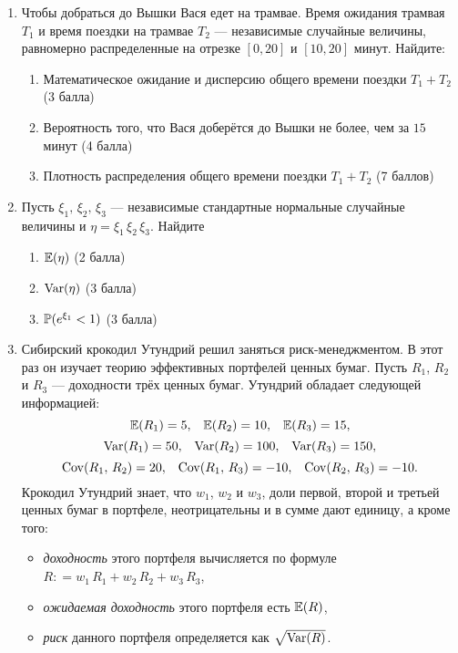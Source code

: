 \begin{enumerate}
    \item Чтобы добраться до Вышки Вася едет на трамвае. Время ожидания трамвая
    $T_{1}$ и время поездки на трамвае $T_{2}$ — независимые случайные величины,
    равномерно распределенные на отрезке $[0,20]$ и $[10,20]$ минут. Найдите:

    \begin{enumerate}
    \item Математическое ожидание и дисперсию общего времени поездки $T_{1}+T_{2}$ (3 балла)
    \item Вероятность того, что Вася доберётся до Вышки не более, чем за $15$ минут (4 балла)
    \item Плотность распределения общего времени поездки $T_{1}+T_{2}$ (7 баллов)
\end{enumerate}

    \item Пусть $\xi_1, \, \xi_2, \, \xi_3$ — независимые стандартные нормальные
    случайные величины и $\eta = \xi_1 \, \xi_2 \, \xi_3$. Найдите
\begin{enumerate}
  \item $\E(\eta)$ (2 балла)
  \item $\Var(\eta)$ (3 балла)
  \item $\P(e^{\xi_1} < 1)$ (3 балла)
\end{enumerate}

    \item Сибирский крокодил Утундрий решил заняться риск-менеджментом. В этот раз
    он изучает теорию эффективных портфелей ценных бумаг. Пусть $R_1$, $R_2$ и $R_3$ —
    доходности трёх ценных бумаг. Утундрий обладает следующей информацией:
\[
    \E(R_1) = 5, \;\;\; \E(R_2) = 10, \;\;\; \E(R_3) = 15,
\]
\[
    \Var(R_1) = 50, \;\;\; \Var(R_2) = 100, \;\;\; \Var(R_3) = 150,
\]
\[
    \Cov(R_1, \, R_2) = 20, \;\;\; \Cov(R_1, \, R_3) = -10, \;\;\; \Cov(R_2, \, R_3) = -10.
\]
Крокодил Утундрий знает, что $w_1$, $w_2$ и $w_3$, доли первой, второй и третьей
ценных бумаг в портфеле, неотрицательны и в сумме дают единицу, а кроме того:
\begin{itemize}
  \item \textit{доходность} этого портфеля вычисляется по формуле
  $R : = w_1 \, R_1 + w_2 \, R_2 + w_3 \, R_3$,
  \item \textit{ожидаемая доходность} этого портфеля есть $\E(R)$,
  \item \textit{риск} данного портфеля определяется как $\sqrt{\Var(R)}$.
\end{itemize}


\end{enumerate}
